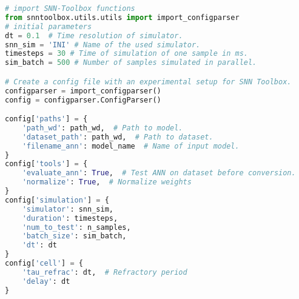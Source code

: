 \begin{lstlisting}[language=Python, caption=Configuration of the SNN-TB, breaklines, frame=single,label={lst:config}]
# import SNN-Toolbox functions
from snntoolbox.utils.utils import import_configparser
# initial parameters
dt = 0.1  # Time resolution of simulator.
snn_sim = 'INI' # Name of the used simulator.
timesteps = 30 # Time of simulation of one sample in ms.
sim_batch = 500 # Number of samples simulated in parallel.

# Create a config file with an experimental setup for SNN Toolbox.
configparser = import_configparser()
config = configparser.ConfigParser()

config['paths'] = {
    'path_wd': path_wd,  # Path to model.
    'dataset_path': path_wd,  # Path to dataset.
    'filename_ann': model_name  # Name of input model.
}
config['tools'] = {
    'evaluate_ann': True,  # Test ANN on dataset before conversion.
    'normalize': True,  # Normalize weights
}
config['simulation'] = {
    'simulator': snn_sim,
    'duration': timesteps,
    'num_to_test': n_samples,
    'batch_size': sim_batch,
    'dt': dt
}
config['cell'] = {
    'tau_refrac': dt,  # Refractory period
    'delay': dt 
}
\end{lstlisting}

